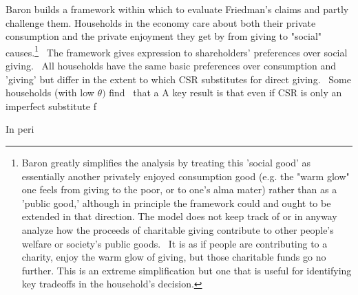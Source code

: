 \documentclass{article}
\begin{document}
Baron builds a framework within which to evaluate Friedman's claims and
partly challenge them. Households in the economy care about both their
private consumption and the private enjoyment they get by from giving to
"social" causes.\footnote{%
Baron greatly simplifies the analysis by treating this 'social good' as
essentially another privately enjoyed consumption good (e.g. the "warm glow"
one feels from giving to the poor, or to one's alma mater) rather than as a
'public good,' although in principle the framework could and ought to be
extended in that direction. The model does not keep track of or in anyway
analyze how the proceeds of charitable giving contribute to other people's
welfare or society's public goods. \ It is as if people are contributing to
a charity, enjoy the warm glow of giving, but those charitable funds go no
further. This is an extreme simplification but one that is useful for
identifying key tradeoffs in the household's decision.} \ The framework
gives expression to shareholders' preferences over social giving. \ All
households have the same basic preferences over consumption and 'giving' but
differ in the extent to which CSR substitutes for direct giving. \ Some
households (with low $\theta )$ find \ that a A key result is that even if
CSR is only an imperfect substitute f

In peri 
\end{document}
